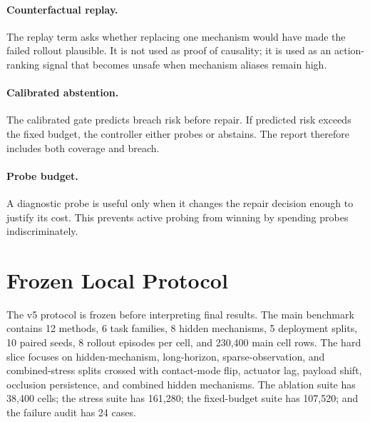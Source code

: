 \documentclass{article}
\begin{document}
\paragraph{Counterfactual replay.} The replay term asks whether replacing one mechanism would have made the failed rollout plausible. It is not used as proof of causality; it is used as an action-ranking signal that becomes unsafe when mechanism aliases remain high.
\paragraph{Calibrated abstention.} The calibrated gate predicts breach risk before repair. If predicted risk exceeds the fixed budget, the controller either probes or abstains. The report therefore includes both coverage and breach.
\paragraph{Probe budget.} A diagnostic probe is useful only when it changes the repair decision enough to justify its cost. This prevents active probing from winning by spending probes indiscriminately.
\section{Frozen Local Protocol}
The v5 protocol is frozen before interpreting final results. The main benchmark contains 12 methods, 6 task families, 8 hidden mechanisms, 5 deployment splits, 10 paired seeds, 8 rollout episodes per cell, and 230,400 main cell rows. The hard slice focuses on hidden-mechanism, long-horizon, sparse-observation, and combined-stress splits crossed with contact-mode flip, actuator lag, payload shift, occlusion persistence, and combined hidden mechanisms. The ablation suite has 38,400 cells; the stress suite has 161,280; the fixed-budget suite has 107,520; and the failure audit has 24 cases.
\begin{table}[t]\centering\small\resizebox{\linewidth}{!}{}\caption{Frozen local gates. Passing these gates does not imply ICLR-main readiness because the external scope gate fails.}\label{tab:gates}\end{table}
\end{document}
